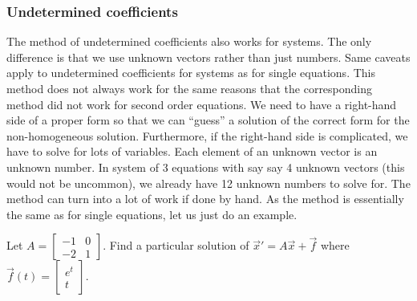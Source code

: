 \documentclass{ximera}
\begin{document}
\subsubsection{Undetermined coefficients}

The method of undetermined coefficients also works for systems. The only difference is that we use unknown vectors rather than just numbers.  Same caveats apply to undetermined coefficients for systems as for single equations.  This method does not always work for the same reasons that the corresponding method did not work for second order equations. We need to have a right-hand side of a proper form so that we can ``guess'' a solution of the correct form for the non-homogeneous solution. Furthermore, if the right-hand side is complicated, we have to solve for lots of variables.  Each element of an unknown vector is an unknown number. In system of 3 equations with say say 4 unknown vectors (this would not be uncommon), we already have 12 unknown numbers to solve for. The method can turn into a lot of  %
work if done by hand. As the method is essentially the same as for single equations, let us just do an example.

\begin{example}
    Let 
    $A = \left[\begin{smallmatrix}
        -1 & 0 \\
        -2 & 1
    \end{smallmatrix} \right]$.
    Find a particular solution of ${\vec{x}}' = A \vec{x} + \vec{f}$ where $\vec{f}(t) = 
    \left[\begin{smallmatrix}
        e^t \\
        t
    \end{smallmatrix} \right]$.
\end{example}
\end{document}
